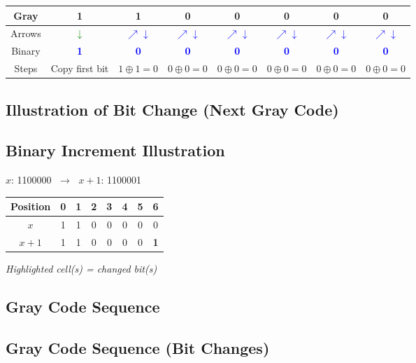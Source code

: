 \begin{tabular}{|c|*7{c|}}
\hline
Gray &  1 &  1 &  0 &  0 &  0 &  0 &  0   \\
\hline
Arrows &     \textcolor{green}{$\downarrow$}
&    \textcolor{blue}{$\nearrow\downarrow$}
&    \textcolor{blue}{$\nearrow\downarrow$}
&    \textcolor{blue}{$\nearrow\downarrow$}
&    \textcolor{blue}{$\nearrow\downarrow$}
&    \textcolor{blue}{$\nearrow\downarrow$}
&    \textcolor{blue}{$\nearrow\downarrow$}
 \\
\hline
Binary &   \textbf{\textcolor{blue}{ 1 }}
&  \textbf{\textcolor{blue}{ 0 }}
&  \textbf{\textcolor{blue}{ 0 }}
&  \textbf{\textcolor{blue}{ 0 }}
&  \textbf{\textcolor{blue}{ 0 }}
&  \textbf{\textcolor{blue}{ 0 }}
&  \textbf{\textcolor{blue}{ 0 }}
 \\
\hline
Steps &   {\small Copy first bit}
&  {\small $1 \oplus 1 = 0$}
&  {\small $0 \oplus 0 = 0$}
&  {\small $0 \oplus 0 = 0$}
&  {\small $0 \oplus 0 = 0$}
&  {\small $0 \oplus 0 = 0$}
&  {\small $0 \oplus 0 = 0$}
 \\
\hline
\end{tabular}


\bigskip

\subsection*{Illustration of Bit Change (Next Gray Code)}
\subsection*{Binary Increment Illustration}

$x$: 1100000 $\;\to\;$ $x+1$: 1100001

\begin{tabular}{|c|*7{c|}}
\hline
Position &  0 &  1 &  2 &  3 &  4 &  5 &  6   \\
\hline
$x$ &  1 &  1 &  0 &  0 &  0 &  0 &  0   \\
\hline
$x+1$ &     1
&    1
&    0
&    0
&    0
&    0
&    \cellcolor{yellow}\textbf{ 1 }
 \\
\hline
\end{tabular}

\emph{Highlighted cell(s) = changed bit(s)}


\bigskip

\subsection*{Gray Code Sequence}
\subsection*{Gray Code Sequence (Bit Changes)}

